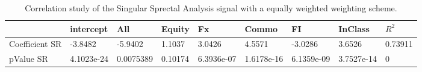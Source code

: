 \begin{table}[H]
\centering
\begin{tabular}{lllllllll}
\hline& intercept & All & Equity & Fx & Commo & FI & InClass & $R^{2}$ \\ 
\hline 
Coefficient SR & -3.8482 & -5.9402 & 1.1037 & 3.0426 & 4.5571 & -3.0286 & 3.6526 & 0.73911 \\ 
pValue SR & 4.1023e-24 & 0.0075389 & 0.10174 & 6.3936e-07 & 1.6178e-16 & 6.1359e-09 & 3.7527e-14 & 0 \\ 
\hline
\end{tabular}
\caption{Correlation study of the Singular Sprectal Analysis signal with a equally weighted weighting scheme.}
\label{SSA_EW_CORR}
\end{table}
